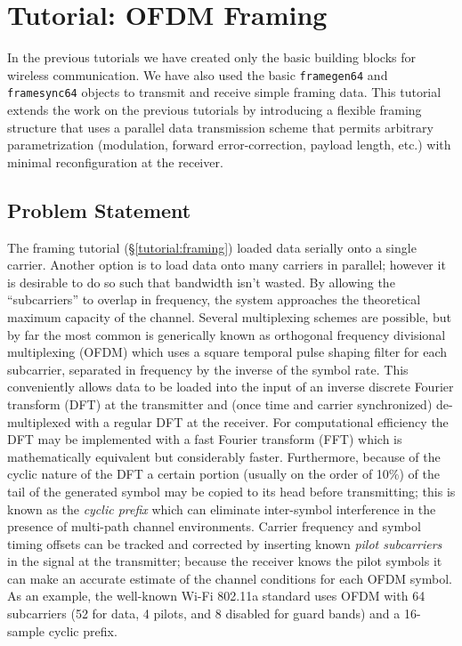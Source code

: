 % 
%

\newpage
\section{Tutorial: OFDM Framing}
\label{tutorial:ofdmflexframe}

In the previous tutorials we have created only the basic building blocks
for wireless communication.
We have also used the basic {\tt framegen64} and {\tt framesync64}
objects to transmit and receive simple framing data.
This tutorial extends the work on the previous tutorials by introducing
a flexible framing structure that uses a parallel data transmission
scheme that permits arbitrary parametrization
(modulation, forward error-correction, payload length, etc.)
with minimal reconfiguration at the receiver.


%
%
\subsection{Problem Statement}
\label{tutorial:ofdmflexframe:problem}
The framing tutorial (\S\ref{tutorial:framing}) loaded data serially
onto a single carrier.
Another option is to load data onto many carriers in parallel;
however it is desirable to do so such that bandwidth isn't wasted.
By allowing the ``subcarriers'' to overlap in frequency,
the system approaches the theoretical maximum capacity of the channel.
Several multiplexing schemes are possible,
but by far the most common is generically known as
orthogonal frequency divisional multiplexing (OFDM)
which uses a square temporal pulse shaping filter for each subcarrier,
separated in frequency by the inverse of the symbol rate.
This conveniently allows data to be loaded into the input of an inverse
discrete Fourier transform (DFT) at the transmitter and
(once time and carrier synchronized)
de-multiplexed with a regular DFT at the receiver.
For computational efficiency the DFT may be implemented with a fast
Fourier transform (FFT) which is mathematically equivalent
but considerably faster.
Furthermore, because of the cyclic nature of the DFT a certain portion
(usually on the order of 10\%)
of the tail of the generated symbol may be copied to its head before
transmitting;
this is known as the {\em cyclic prefix} which can eliminate
inter-symbol interference in the presence of multi-path channel
environments.
Carrier frequency and symbol timing offsets can be tracked and corrected
by inserting known {\em pilot subcarriers} in the signal at the
transmitter;
because the receiver knows the pilot symbols it can make an accurate
estimate of the channel conditions for each OFDM symbol.
%
%
As an example, the well-known Wi-Fi 802.11a standard uses OFDM with
64 subcarriers
(52 for data, 4 pilots, and 8 disabled for guard bands)
and a 16-sample cyclic prefix.
%

